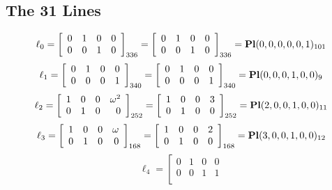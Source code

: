 \documentclass{article}
\begin{document}
{\subsection*{The 31 Lines}
$$
\ell_{0} = 
\left[
\begin{array}{*{4}{r}}
0 & 1 & 0 & 0\\
0 & 0 & 1 & 0\\
\end{array}
\right]
_{336}
=
\left[
\begin{array}{*{4}c}
0  & 1  & 0  & 0\\
0  & 0  & 1  & 0\\
\end{array}
\right]_{336}
={\rm\bf Pl}(0,0,0,0,0,1 )_{101}$$
$$
\ell_{1} = 
\left[
\begin{array}{*{4}{r}}
0 & 1 & 0 & 0\\
0 & 0 & 0 & 1\\
\end{array}
\right]
_{340}
=
\left[
\begin{array}{*{4}c}
0  & 1  & 0  & 0\\
0  & 0  & 0  & 1\\
\end{array}
\right]_{340}
={\rm\bf Pl}(0,0,0,1,0,0 )_{9}$$
$$
\ell_{2} = 
\left[
\begin{array}{*{4}{r}}
1 & 0 & 0 & \omega^{2}\\
0 & 1 & 0 & 0\\
\end{array}
\right]
_{252}
=
\left[
\begin{array}{*{4}c}
1  & 0  & 0  & 3\\
0  & 1  & 0  & 0\\
\end{array}
\right]_{252}
={\rm\bf Pl}(2,0,0,1,0,0 )_{11}$$
$$
\ell_{3} = 
\left[
\begin{array}{*{4}{r}}
1 & 0 & 0 & \omega \\
0 & 1 & 0 & 0\\
\end{array}
\right]
_{168}
=
\left[
\begin{array}{*{4}c}
1  & 0  & 0  & 2\\
0  & 1  & 0  & 0\\
\end{array}
\right]_{168}
={\rm\bf Pl}(3,0,0,1,0,0 )_{12}$$
$$
\ell_{4} = 
\left[
\begin{array}{*{4}{r}}
0 & 1 & 0 & 0\\
0 & 0 & 1 & 1\\

\end{array}$$}
\end{document}

